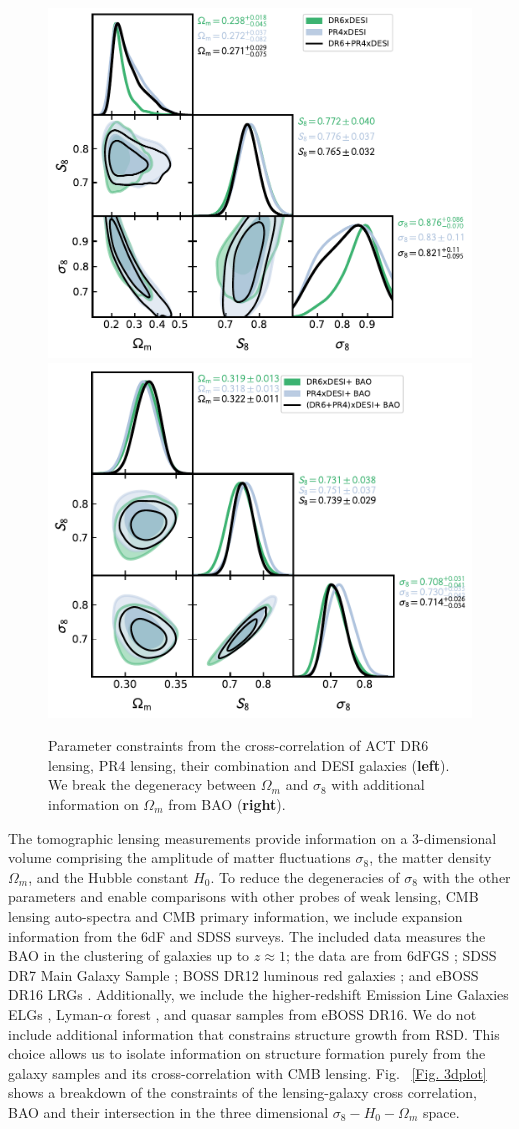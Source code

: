 \documentclass[twocolumn]{aastex631}
\begin{document}
{\begin{figure}
    \centering
    \includegraphics[width=0.5\linewidth]{figures/combined_contours.pdf}%
    \includegraphics[width=0.5\linewidth]{figures/combinedBAO.pdf}
    \caption{Parameter constraints from the cross-correlation of ACT DR6 lensing, PR4 lensing, their combination and DESI galaxies (\textbf{left}). We break the degeneracy between $\Omega_m$ and $\sigma_8$ with additional information on $\Omega_m$ from BAO (\textbf{right}). }
    \label{fig:planckXcorner with bao}
\end{figure}


The tomographic lensing measurements provide information on a 3-dimensional volume comprising the amplitude of matter fluctuations $\sigma_8$, the matter density $\Omega_m$, and the Hubble constant $H_0$. To reduce the degeneracies of $\sigma_8$ with the other parameters and enable comparisons with other probes of weak lensing, CMB lensing auto-spectra and CMB primary information, we include expansion information from the 6dF and SDSS surveys. The included data measures the BAO in the clustering of galaxies up to $z\approx1$; the data are from 6dFGS \citep{1106.3366}; SDSS DR7 Main Galaxy Sample \citep{1409.3242}; BOSS DR12 luminous red galaxies \citep{Alam17}; and eBOSS DR16 LRGs \citep{Alam2021}. Additionally, we include the higher-redshift Emission Line Galaxies ELGs  \citep{2016A+A...592A.121C}, Lyman-$\alpha$ forest \citep{2020ApJ...901..153D}, and quasar samples \citep{Alam2021} from eBOSS DR16. We do not include additional information that constrains structure growth from RSD. This choice allows us to isolate information on structure formation purely from the galaxy samples and its cross-correlation with CMB lensing. Fig. ~\ref{Fig. 3dplot} shows a breakdown of the constraints of the lensing-galaxy cross correlation, BAO and their intersection in the three dimensional $\sigma_8-H_0-\Omega_m$ space.

}
\end{document}
